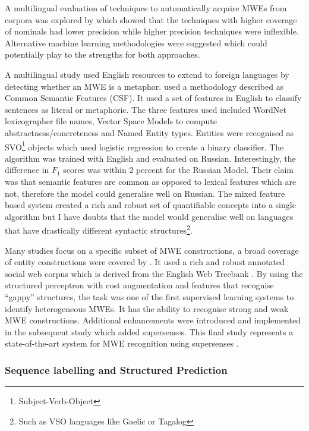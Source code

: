 A multilingual evaluation of techniques to automatically acquire MWEs from corpora was explored by \cite{Ramisch2012} which showed that the techniques with higher coverage of nominals had lower precision while higher precision techniques were inflexible. Alternative machine learning methodologies were suggested which could potentially play to the strengths for both approaches. 

A multilingual study used English resources to extend to foreign languages by detecting whether an MWE is a metaphor. \cite{Tsvetkov2013} used a methodology described as Common Semantic Features (CSF). It used a set of features in English to classify sentences as literal or metaphoric. The three features used included WordNet lexicographer file names, Vector Space Models to compute abstractness/concreteness and Named Entity types. Entities were recognised as SVO\footnote{Subject-Verb-Object} objects which used logistic regression to create a binary classifier. The algorithm was trained with English and evaluated on Russian. Interestingly, the difference in $F_1$ scores was within 2 percent for the Russian Model. Their claim was that semantic features are common as opposed to lexical features which are not, therefore the model could generalise well on Russian. The mixed feature based system created a rich and robust set of quantifiable concepts into a single algorithm but I have doubts that the model would generalise well on languages that have drastically different syntactic structures\footnote{Such as VSO languages like Gaelic or Tagalog}.

Many studies focus on a specific subset of MWE constructions, a broad coverage of entity constructions were covered by \cite{Schneider2014}. It used a rich and robust annotated social web corpus \cite{Schneider2014a} which is derived from the English Web Treebank \cite{bies2012english}. By using the structured perceptron with cost augmentation and features that recognise ``gappy'' structures, the task was one of the first supervised learning systems to identify heterogeneous MWEs. It has the ability to recognise strong and weak MWE constructions. Additional enhancements were introduced and implemented in the subsequent study \cite{Schneider2015} which added supersenses. This final study represents a state-of-the-art system for MWE recognition using supersenses \cite{Schneider2015}.
  
\subsubsection{Sequence labelling and Structured Prediction}

